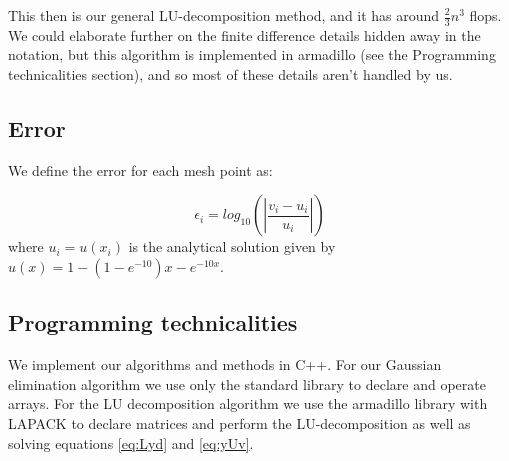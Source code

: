 This then is our general LU-decomposition method, and it has around
$\frac{2}{3}n^3$ flops. We could elaborate further on the finite difference
details hidden away in the notation, but this algorithm is implemented in
armadillo (see the Programming technicalities section), and so most of these details
aren't handled by us.

\subsection{Error}
\label{sec:error}

We define the error for each mesh point as:

	\begin{equation}
	\epsilon_i=log_{10}\left(\left|\frac{v_i-u_i}{u_i}\right|\right)
	\end{equation}
where $u_i=u(x_i)$ is the analytical solution given by $u(x) = 1-(1-e^{-10})x-e^{-10x}$.

\subsection{Programming technicalities}
\label{sec:proglang}

We implement our algorithms and methods in C++. For our Gaussian elimination
algorithm we use only the standard library to declare and operate arrays.
For the LU decomposition algorithm we use the armadillo library with LAPACK to
declare matrices and perform the LU-decomposition as well as solving equations
\ref{eq:Lyd} and \ref{eq:yUv}.
